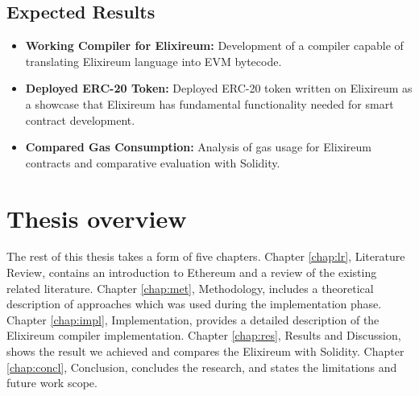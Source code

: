\subsection{Expected Results}
\begin{itemize}
  \item \textbf{Working Compiler for Elixireum:} Development of a compiler capable of translating Elixireum language into EVM bytecode.
  
  \item \textbf{Deployed ERC-20 Token:} Deployed ERC-20 token written on Elixireum as a showcase that Elixireum has fundamental functionality needed for smart contract development.
  
  \item \textbf{Compared Gas Consumption:} Analysis of gas usage for Elixireum contracts and comparative evaluation with Solidity.
\end{itemize}

\section{Thesis overview}
\label{sec:thesoverview}

The rest of this thesis takes a form of five chapters. Chapter \ref{chap:lr}, Literature Review, contains an introduction to Ethereum and a review of the existing related literature. Chapter \ref{chap:met}, Methodology, includes a theoretical description of approaches which was used during the implementation phase. Chapter \ref{chap:impl}, Implementation, provides a detailed description of the Elixireum compiler implementation. Chapter \ref{chap:res}, Results and Discussion, shows the result we achieved and compares the Elixireum with Solidity. Chapter \ref{chap:concl}, Conclusion, concludes the research, and states the limitations and future work scope.

